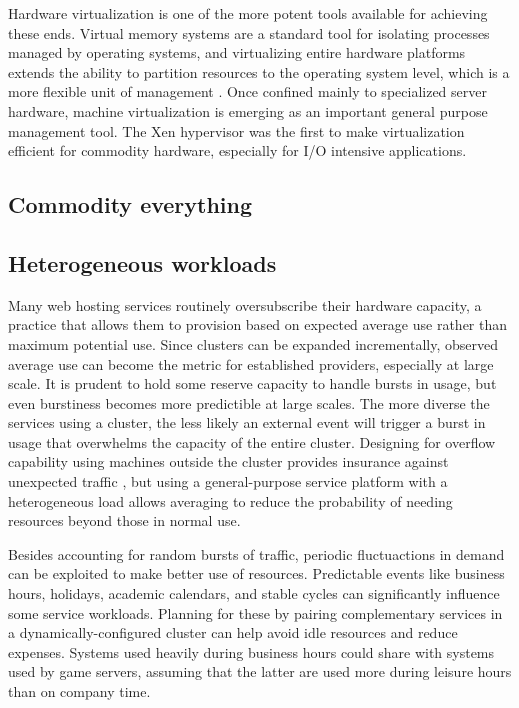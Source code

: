 Hardware virtualization is one of the more potent tools available for achieving these ends. Virtual memory systems are a standard tool for isolating processes managed by operating systems, and virtualizing entire hardware platforms extends the ability to partition resources to the operating system level, which is a more flexible unit of management \cite{hand}. Once confined mainly to specialized server hardware, machine virtualization is emerging as an important general purpose management tool. The Xen hypervisor \cite{barham} was the first to make virtualization efficient for commodity hardware, especially for I/O intensive applications.

\subsection{Commodity everything}

\subsection{Heterogeneous workloads}

Many web hosting services routinely oversubscribe their hardware capacity, a practice that allows them to provision based on expected average use rather than maximum potential use. Since clusters can be expanded incrementally, observed average use can become the metric for established providers, especially at large scale. It is prudent to hold some reserve capacity to handle bursts in usage, but even burstiness becomes more predictible at large scales. The more diverse the services using a cluster, the less likely an external event will trigger a burst in usage that overwhelms the capacity of the entire cluster. Designing for overflow capability using machines outside the cluster provides insurance against unexpected traffic \cite{fox}, but using a general-purpose service platform with a heterogeneous load allows averaging to reduce the probability of needing resources beyond those in normal use.

Besides accounting for random bursts of traffic, periodic fluctuactions in demand can be exploited to make better use of resources. Predictable events like business hours, holidays, academic calendars, and stable cycles can significantly influence some service workloads. Planning for these by pairing complementary services in a dynamically-configured cluster can help avoid idle resources and reduce expenses. Systems used heavily during business hours could share with systems used by game servers, assuming that the latter are used more during leisure hours than on company time.

